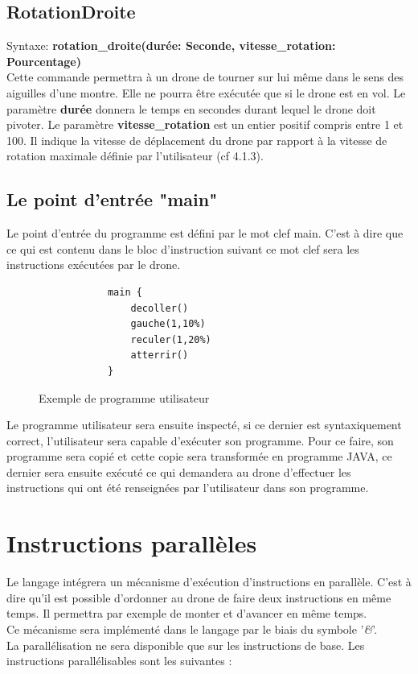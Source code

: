 \documentclass[12pt, openany]{report}
\begin{document}
\subsection{RotationDroite}
\quad Syntaxe: \textbf{rotation\_droite(durée: Seconde, vitesse\_rotation: Pourcentage)} \\
Cette commande permettra à un drone de tourner sur lui même dans le sens des aiguilles d'une montre. 
Elle ne pourra être exécutée que si le drone est en vol.
Le paramètre \textbf{durée} donnera le temps en secondes durant lequel le drone doit pivoter.
Le paramètre \textbf{vitesse\_rotation} est un entier positif compris entre 1 et 100. Il indique la vitesse de déplacement du drone par rapport à la vitesse de rotation maximale définie par l'utilisateur (cf 4.1.3). \\

\subsection{Le point d'entrée "main"}
Le point d'entrée du programme est défini par le mot clef main. C'est à dire que ce qui est contenu dans le bloc d'instruction suivant ce mot clef sera les instructions exécutées par le drone.

    \begin{figure}[h!]
        \begin{center}
            \begin{Verbatim}
            main {
                decoller()
                gauche(1,10%)
                reculer(1,20%)
                atterrir()
            }
            \end{Verbatim}
        \end{center}
        \caption{Exemple de programme utilisateur}
        \label{Exemple de programme utilisateur}
    \end{figure}
Le programme utilisateur sera ensuite inspecté, si ce dernier est syntaxiquement correct, l'utilisateur sera capable d'exécuter son programme. Pour ce faire, son programme sera copié et cette copie sera transformée en programme JAVA, ce dernier sera ensuite exécuté ce qui demandera au drone d'effectuer les instructions qui ont été renseignées par l'utilisateur dans son programme.

\section{Instructions parallèles}
Le langage intégrera un mécanisme d'exécution d'instructions en parallèle. C'est à dire qu'il est possible d'ordonner au drone de faire deux instructions en même temps.
Il permettra par exemple de monter et d'avancer en même temps. \\
Ce mécanisme sera implémenté dans le langage par le biais du symbole '\textit{\&}'. \\
La parallélisation ne sera disponible que sur les instructions de base.
Les instructions parallélisables sont les suivantes :
\end{document}
